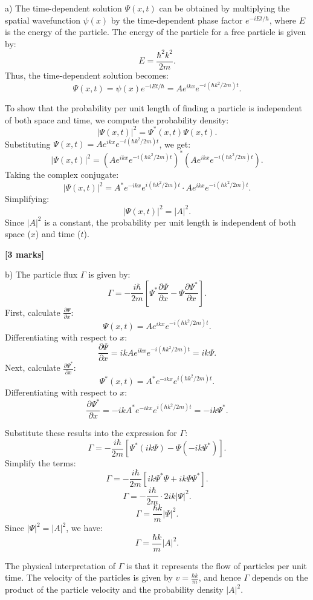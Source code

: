 a) The time-dependent solution $\Psi(x,t)$ can be obtained by multiplying the spatial wavefunction $\psi(x)$ by the time-dependent phase factor $e^{-iEt/\hbar}$, where $E$ is the energy of the particle. The energy of the particle for a free particle is given by:
\[
E = \frac{\hbar^2 k^2}{2m}.
\]
Thus, the time-dependent solution becomes:
\[
\Psi(x,t) = \psi(x)e^{-iEt/\hbar} = A e^{ikx} e^{-i(\hbar k^2 / 2m)t}.
\]

To show that the probability per unit length of finding a particle is independent of both space and time, we compute the probability density:
\[
|\Psi(x,t)|^2 = \Psi^*(x,t)\Psi(x,t).
\]
Substituting $\Psi(x,t) = A e^{ikx} e^{-i(\hbar k^2 / 2m)t}$, we get:
\[
|\Psi(x,t)|^2 = \left(A e^{ikx} e^{-i(\hbar k^2 / 2m)t}\right)^* \left(A e^{ikx} e^{-i(\hbar k^2 / 2m)t}\right).
\]
Taking the complex conjugate:
\[
|\Psi(x,t)|^2 = A^* e^{-ikx} e^{i(\hbar k^2 / 2m)t} \cdot A e^{ikx} e^{-i(\hbar k^2 / 2m)t}.
\]
Simplifying:
\[
|\Psi(x,t)|^2 = |A|^2.
\]
Since $|A|^2$ is a constant, the probability per unit length is independent of both space ($x$) and time ($t$).

\textbf{[3 marks]}

b) The particle flux $\Gamma$ is given by:
\[
\Gamma = -\frac{i \hbar}{2m} \left[ \Psi^* \frac{\partial \Psi}{\partial x} - \Psi \frac{\partial \Psi^*}{\partial x} \right].
\]
First, calculate $\frac{\partial \Psi}{\partial x}$:
\[
\Psi(x,t) = A e^{ikx} e^{-i(\hbar k^2 / 2m)t}.
\]
Differentiating with respect to $x$:
\[
\frac{\partial \Psi}{\partial x} = ik A e^{ikx} e^{-i(\hbar k^2 / 2m)t} = ik \Psi.
\]
Next, calculate $\frac{\partial \Psi^*}{\partial x}$:
\[
\Psi^*(x,t) = A^* e^{-ikx} e^{i(\hbar k^2 / 2m)t}.
\]
Differentiating with respect to $x$:
\[
\frac{\partial \Psi^*}{\partial x} = -ik A^* e^{-ikx} e^{i(\hbar k^2 / 2m)t} = -ik \Psi^*.
\]

Substitute these results into the expression for $\Gamma$:
\[
\Gamma = -\frac{i \hbar}{2m} \left[ \Psi^* (ik\Psi) - \Psi (-ik\Psi^*) \right].
\]
Simplify the terms:
\[
\Gamma = -\frac{i \hbar}{2m} \left[ i k \Psi^* \Psi + i k \Psi \Psi^* \right].
\]
\[
\Gamma = -\frac{i \hbar}{2m} \cdot 2i k |\Psi|^2.
\]
\[
\Gamma = \frac{\hbar k}{m} |\Psi|^2.
\]
Since $|\Psi|^2 = |A|^2$, we have:
\[
\Gamma = \frac{\hbar k}{m} |A|^2.
\]

The physical interpretation of $\Gamma$ is that it represents the flow of particles per unit time. The velocity of the particles is given by $v = \frac{\hbar k}{m}$, and hence $\Gamma$ depends on the product of the particle velocity and the probability density $|A|^2$.

